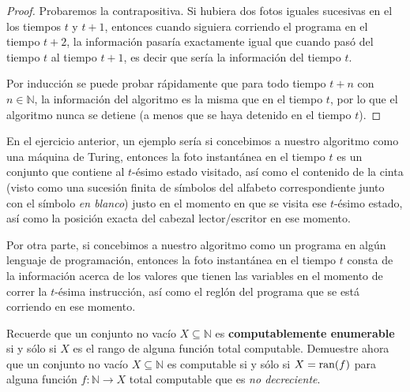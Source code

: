 \documentclass[12pt]{report}
\newcounter{it}
\theoremstyle{largebreak}
\newcommand\cf[3]{\ensuremath{#1:#2\rightarrow#3}}
\begin{document}
    \begin{proof}
        Probaremos la contrapositiva. Si hubiera dos fotos iguales sucesivas en el los tiempos $t$ y $t+1$, entonces cuando siguiera corriendo el programa en el tiempo $t+2$, la información pasaría exactamente igual que cuando pasó del tiempo $t$ al tiempo $t+1$, es decir que sería la información del tiempo $t$.
        
        Por inducción se puede probar rápidamente que para todo tiempo $t+n$ con $n\in\mathbb{N}$, la información del algoritmo es la misma que en el tiempo $t$, por lo que el algoritmo nunca se detiene (a menos que se haya detenido en el tiempo $t$).
    \end{proof}

    \begin{exa}
        En el ejercicio anterior, un ejemplo sería si concebimos a nuestro algoritmo como una máquina de Turing, entonces la foto instantánea en el tiempo $t$ es un conjunto que contiene al $t$-ésimo estado visitado, así como el contenido de la cinta (visto como una sucesión finita de símbolos del alfabeto correspondiente junto con el símbolo \textit{en blanco}) justo en el momento en que se visita ese $t$-ésimo estado, así como la posición exacta del cabezal lector/escritor en ese momento.

        Por otra parte, si concebimos a nuestro algoritmo como un programa en algún lenguaje de programación, entonces la foto instantánea en el tiempo $t$ consta de la información acerca de los valores que tienen las variables en el momento de correr la $t$-ésima instrucción, así como el reglón del programa que se está corriendo en ese momento.
    \end{exa}

    \begin{excer}
        Recuerde que un conjunto no vacío $X\subseteq\mathbb{N}$ es \textbf{computablemente enumerable} si y sólo si $X$ es el rango de alguna función total computable. Demuestre ahora que un conjunto no vacío $X\subseteq\mathbb{N}$ es computable si y sólo si $X=\textup{ran}(f)$ para alguna función $\cf{f}{\mathbb{N}}{X}$ total computable que es \textit{no decreciente}.
    \end{excer}
\end{document}

